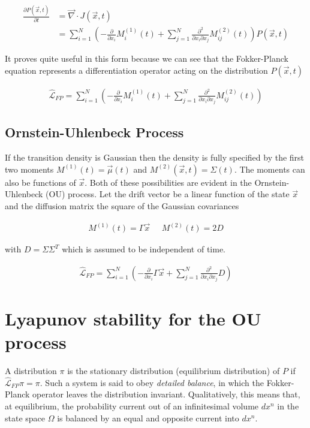 \documentclass{article}
\begin{document}
\begin{align}
\frac{\partial P(\vec{x},t)}{\partial t}  &= \vec{\nabla} \cdot J(\vec{x},t)\\
&= \sum_{i=1}^{N}\left(-\frac{\partial}{\partial x_{i}}M_{i}^{(1)}(t) + \sum_{j=1}^{N} \frac{\partial^{2}}{\partial x_{i}\partial x_{j}}M_{ij}^{(2)}(t)\right)P(\vec{x},t)
\end{align}

It proves quite useful in this form because we can see that the Fokker-Planck equation represents a differentiation operator acting on the distribution $P(\vec{x},t)$

\begin{align}
\hat{\mathcal{L}}_{FP} = \sum_{i=1}^{N}\left(-\frac{\partial}{\partial x_{i}}M_{i}^{(1)}(t) + \sum_{j=1}^{N} \frac{\partial^{2}}{\partial x_{i}\partial x_{j}}M_{ij}^{(2)}(t)\right)
\end{align}

\subsection{Ornstein-Uhlenbeck Process}

If the transition density is Gaussian then the density is fully specified by the first two moments $M^{(1)}(t) = \vec{\mu}(t)$ and $M^{(2)}(\vec{x},t) = \Sigma(t)$. The moments can also be functions of $\vec{x}$. Both of these possibilities are evident in the Ornstein-Uhlenbeck (OU) process. Let the drift vector be a linear function of the state $\vec{x}$ and the diffusion matrix the square of the Gaussian covariances

\begin{align*}
M^{(1)}(t) = \Gamma \vec{x}\;\;\;\;\;M^{(2)}(t) = 2D
\end{align*}

with $D = \Sigma\Sigma^{T}$ which is assumed to be independent of time.

\begin{align}
\hat{\mathcal{L}}_{FP} = \sum_{i=1}^{N}\left(-\frac{\partial}{\partial x_{i}}\Gamma\vec{x} + \sum_{j=1}^{N} \frac{\partial^{2}}{\partial x_{i}\partial x_{j}}D\right)
\end{align}

\section{Lyapunov stability for the OU process}

A distribution $\pi$ is the stationary distribution (equilibrium distribution) of $P$ if $\hat{\mathcal{L}}_{FP}\pi = \pi$. Such a system is said to obey \emph{detailed balance}, in which the Fokker-Planck operator leaves the distribution invariant. Qualitatively, this means that, at equilibrium, the probability current out of an infinitesimal volume $dx^{n}$ in the state space $\Omega$ is balanced by an equal and opposite current into $dx^{n}$. 
\end{document}
